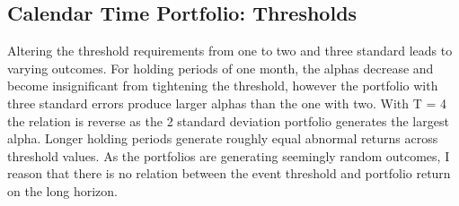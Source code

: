 \setlength{\tabcolsep}{15pt}
\begin{table}[H]
\small
\centering
\caption{FF-5 alpha with equal weights and edit event rule } 
\label{tab: FF5_sensitivity}
\end{table}

\subsection{Calendar Time Portfolio: Thresholds}

Altering the threshold requirements from one to two and three standard leads to varying outcomes. For holding periods of one month, the alphas decrease and become insignificant from tightening the threshold, however the portfolio with three standard errors produce larger alphas than the one with two. With T = 4 the relation is reverse as the 2 standard deviation portfolio generates the largest alpha. Longer holding periods generate roughly equal abnormal returns across threshold values. As the portfolios are generating seemingly random outcomes, I reason that there is no relation between the event threshold and portfolio return on the long horizon. 


